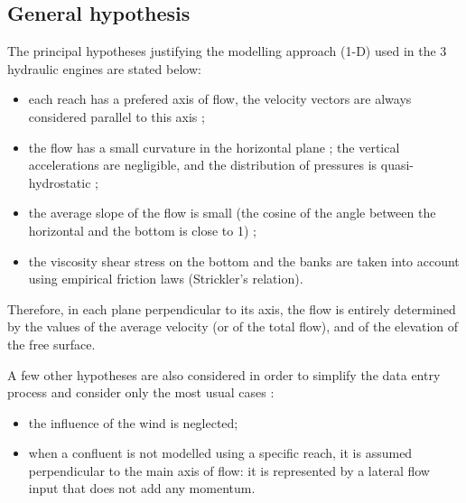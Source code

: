 \subsection{General hypothesis}

The principal hypotheses justifying the modelling approach (1-D) used in the 3 hydraulic engines are stated below:

\vspace{0.5cm}
\begin{itemize}
 \item each reach has a prefered axis of flow, the velocity vectors are always considered parallel to this axis ;
 \item the flow has a small curvature in the horizontal plane ; the vertical accelerations are negligible, and the distribution of pressures is quasi-hydrostatic ;
 \item the average slope of the flow is small (the cosine of the angle between the horizontal and the bottom is close to 1) ;
 \item the viscosity shear stress on the bottom and the banks are taken into account using empirical friction laws (Strickler's relation).
\end{itemize}

\vspace{0.5cm}



Therefore, in each plane perpendicular to its axis, the flow is entirely determined by the values of the average velocity (or of the total flow), and of the elevation of the free surface.

\vspace{0.5cm}

A few other hypotheses are also considered in order to simplify the data entry process and consider only the most usual cases :
\vspace{0.5cm}
\begin{itemize}
 \item the influence of the wind is neglected;
 \item when a confluent is not modelled using a specific reach, it is assumed perpendicular to the main axis of flow: it is represented by a lateral flow input that does not add any momentum.
\end{itemize}

\vspace{0.5cm}

